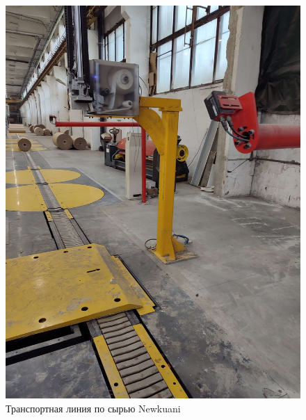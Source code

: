 \begin{figure}
\begin{center}
  \includegraphics[height=0.4\textheight, width=\textwidth, keepaspectratio]{Pics/d_Newkuani_7.JPEG}
\end{center}
  \caption{Транспортная линия по сырью Newkuani}
  \label{pic:d_Newkuani_7}
\end{figure}

